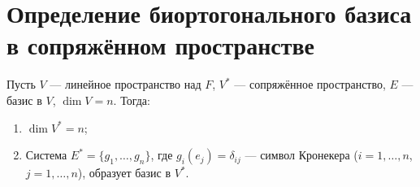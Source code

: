 \section{Определение биортогонального базиса в сопряжённом пространстве}

\begin{definition}
Пусть $V$ --- линейное пространство над $F$, $V^*$ --- сопряжённое пространство, $E$ --- базис в $V$, $\dim V = n$. Тогда:
\begin{enumerate}
    \item $\dim V^* = n$;
    \item Система $E^* = \{g_1, \ldots, g_n\}$, где $g_i(e_j) = \delta_{ij}$ --- символ Кронекера ($i = 1,\ldots,n$, $j = 1,\ldots,n$), образует базис в $V^*$.
\end{enumerate}
\end{definition}
